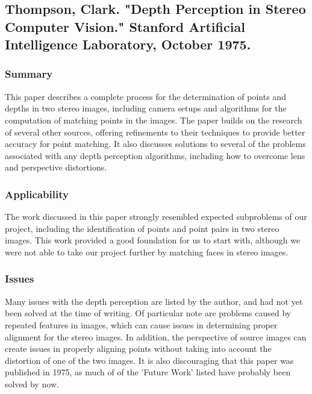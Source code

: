 \subsection{Thompson, Clark. "Depth Perception in Stereo Computer Vision." Stanford Artificial Intelligence Laboratory, October 1975.}

\subsubsection{Summary}
This paper describes a complete process for the determination of points and depths in two stereo images, including camera setups and algorithms for the computation of matching points in the images. The paper builds on the research of several other sources, offering refinements to their techniques to provide better accuracy for point matching. It also discusses solutions to several of the problems associated with any depth perception algorithms, including how to overcome lens and perspective distortions.

\subsubsection{Applicability}
The work discussed in this paper strongly resembled expected subproblems of our project, including the identification of points and point pairs in two stereo images. This work provided a good foundation for us to start with, although we were not able to take our project further by matching faces in stereo images.

\subsubsection{Issues}
Many issues with the depth perception are listed by the author, and had not yet been solved at the time of writing. Of particular note are problems caused by repeated features in images, which can cause issues in determining proper alignment for the stereo images. In addition, the perspective of source images can create issues in properly aligning points without taking into account the distortion of one of the two images. It is also discouraging that this paper was published in 1975, as much of of the 'Future Work' listed have probably been solved by now.
